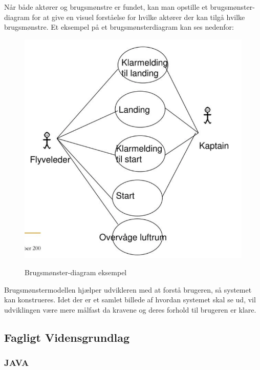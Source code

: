 \noindent
Når både aktører og brugsmønstre er fundet, kan man opstille et brugsmønster-diagram for at give en visuel forståelse for hvilke aktører der kan tilgå hvilke brugsmønstre. Et eksempel på et brugsmønsterdiagram kan ses nedenfor: \\
\begin{figure}[h]
    \centering
    \includegraphics[scale=1]{figures/2. Faglig vidensgrundlag/UseCaseExample.png} \\
    \label{fig:use_case_example}
    \caption{Brugsmønster-diagram eksempel}
\end{figure}
\noindent
Brugsmønstermodellen hjælper udvikleren med at forstå brugeren, så systemet kan konstrueres. Idet der er et samlet billede af hvordan systemet skal se ud, vil udviklingen være mere målfast da kravene og deres forhold til brugeren er klare.


\subsection{Fagligt Vidensgrundlag}

\subsubsection{JAVA}

